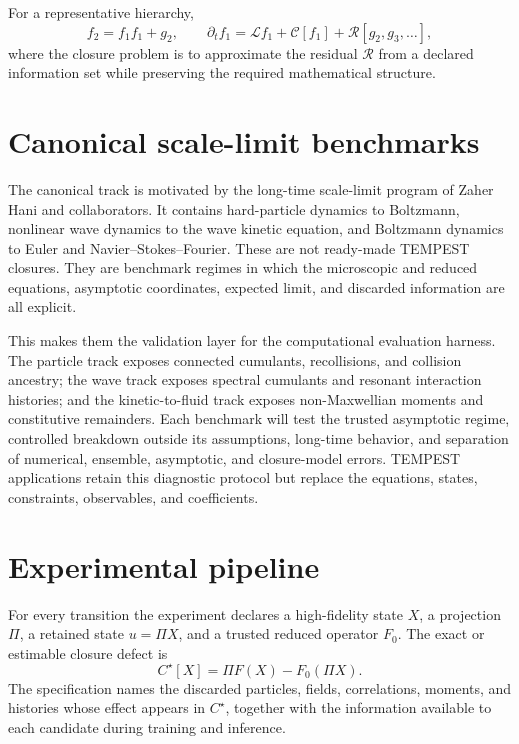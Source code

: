\documentclass[11pt]{article}
\begin{document}
For a representative hierarchy,
\begin{equation}
  f_2=f_1f_1+g_2,
  \qquad
  \partial_t f_1=\mathcal L f_1+\mathcal C[f_1]
  +\mathcal R[g_2,g_3,\ldots],
\end{equation}
where the closure problem is to approximate the residual $\mathcal R$ from a
declared information set while preserving the required mathematical structure.

\section{Canonical scale-limit benchmarks}
The canonical track is motivated by the long-time scale-limit program of
Zaher Hani and collaborators. It contains hard-particle dynamics to
Boltzmann, nonlinear wave dynamics to the wave kinetic equation, and
Boltzmann dynamics to Euler and Navier--Stokes--Fourier. These are not
ready-made TEMPEST closures. They are benchmark regimes in which the
microscopic and reduced equations, asymptotic coordinates, expected limit,
and discarded information are all explicit.

This makes them the validation layer for the computational evaluation
harness. The particle track exposes connected cumulants, recollisions, and
collision ancestry; the wave track exposes spectral cumulants and resonant
interaction histories; and the kinetic-to-fluid track exposes
non-Maxwellian moments and constitutive remainders. Each benchmark will test
the trusted asymptotic regime, controlled breakdown outside its assumptions,
long-time behavior, and separation of numerical, ensemble, asymptotic, and
closure-model errors. TEMPEST applications retain this diagnostic protocol
but replace the equations, states, constraints, observables, and coefficients.

\section{Experimental pipeline}
For every transition the experiment declares a high-fidelity state $X$, a
projection $\Pi$, a retained state $u=\Pi X$, and a trusted reduced operator
$F_0$. The exact or estimable closure defect is
\begin{equation}
  C^\star[X]=\Pi F(X)-F_0(\Pi X).
\end{equation}
The specification names the discarded particles, fields, correlations,
moments, and histories whose effect appears in $C^\star$, together with the
information available to each candidate during training and inference.
\end{document}
